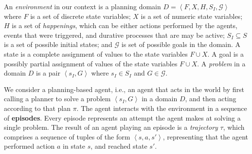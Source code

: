 \documentclass[letterpaper]{article} %
\newcommand{\tuple}[1]{\ensuremath{\left \langle #1 \right \rangle }} %
\begin{document}
An \emph{environment} in our context is a planning domain $D=\tuple{F, X, H, S_I, \mathcal{G}}$ where
$F$ is a set of discrete state variables;
$X$ is a set of numeric state variables;
$H$ is a set of \emph{happenings}, which can be either actions performed by the agents, events that were triggered, and durative processes that are may be active;
$S_I\subseteq S$ is a set of possible initial states;
and  $\mathcal{G}$ is set of possible goals in the domain.
A state is a complete assignment of values to the state variables $F\cup X$.
A goal is a possibly partial assignment of values of the state variables $F\cup X$.
A \emph{problem} in a domain $D$ is a pair $\tuple{s_I, G}$ where $s_I\in S_I$ and $G\in \mathcal{G}$.


We consider a planning-based agent, i.e., an agent that acts in the world by first calling a planner to solve a problem $\tuple{s_I, G}$ in a domain $D$, and then acting according to that plan $\pi$.
The agent interacts with the environment in a sequence of \textbf{episodes}.
Every episode represents an attempt the agent makes at solving a single problem.
The result of an agent playing an episode is a \emph{trajectory} $\tau$, which comprises a sequence of tuples of the form $\tuple{s, a, s'}$, representing that the agent performed action $a$ in state $s$, and reached state $s'$.

\end{document}
